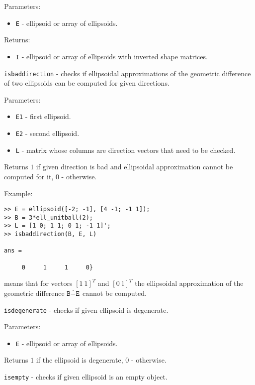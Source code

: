 Parameters:
\begin{itemize}
\item {\tt E} - ellipsoid or array of ellipsoids.
\end{itemize}

Returns:
\begin{itemize}
\item {\tt I} - ellipsoid or array of ellipsoids with inverted shape matrices.
\end{itemize}

\newpage

{\Large {\tt isbaddirection}} - checks if ellipsoidal approximations of
the geometric difference of two ellipsoids can be computed for given
directions.

Parameters:
\begin{itemize}
\item {\tt E1} - first ellipsoid.
\item {\tt E2} - second ellipsoid.
\item {\tt L} - matrix whose columns are direction vectors that need to be
checked.
\end{itemize}

Returns $1$ if given direction is bad and ellipsoidal approximation cannot
be computed for it, $0$ - otherwise.

Example:
{\tt \begin{verbatim}
>> E = ellipsoid([-2; -1], [4 -1; -1 1]);
>> B = 3*ell_unitball(2);
>> L = [1 0; 1 1; 0 1; -1 1]';
>> isbaddirection(B, E, L)

ans =

     0     1     1     0}
\end{verbatim} }
means that for vectors $[1 ~ 1]^T$ and $[0 ~ 1]^T$ the ellipsoidal approximation
of the geometric difference ${\tt B}\dot{-}{\tt E}$ cannot be computed.

\newpage

{\Large {\tt isdegenerate}} - checks if given ellipsoid is degenerate.

Parameters:
\begin{itemize}
\item {\tt E} - ellipsoid or array of ellipsoids.
\end{itemize}

Returns $1$ if the ellipsoid is degenerate, $0$ - otherwise.

\newpage

{\Large {\tt isempty}} - checks if given ellipsoid is an empty object.

